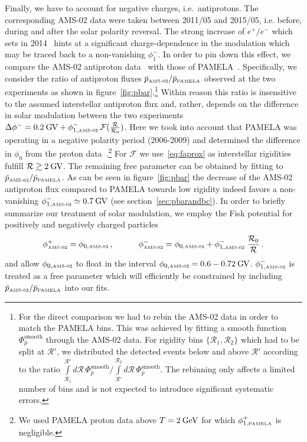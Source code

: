\documentclass[a4paper,11pt]{article}
\newcommand{\eVdist}{\kern-0.06em}
\newcommand{\gev}{\:\text{Ge\eVdist V}}
\newcommand{\gv}{\:\text{G\eVdist V}}
\begin{document}
Finally, we have to account for negative charges, i.e.\ antiprotons. The corresponding AMS-02 data were taken between 2011/05 and 2015/05, i.e. before, during and after the solar polarity reversal. The strong increase of $e^+/e^-$ which sets in 2014~\cite{Adriani:2016uhu} hints at a significant charge-dependence in the modulation which may be traced back to a non-vanishing $\phi_1^-$. In order to pin down this effect, we compare the AMS-02 antiproton data~\cite{Aguilar:2016kjl} with those of PAMELA~\cite{Adriani:2012paa}. Specifically, we consider the ratio of antiproton fluxes $\bar{p}_{\text{\tiny{AMS-02}}}/\bar{p}_{\text{\tiny{PAMELA}}}$ observed at the two experiments as shown in figure~\ref{fig:pbar}.\footnote{For the direct comparison we had to rebin the AMS-02 data in order to match the PAMELA bins. This was achieved by fitting a smooth function $\Phi_{\bar{p}}^\text{smooth}$ through the AMS-02 data. For rigidity bins $\{\mathcal{R}_1,\mathcal{R}_2\}$ which had to be split at $\mathcal{R}'$, we distributed the detected events below and above $\mathcal{R}'$ according to the ratio $\int\limits_{\mathcal{R}_1}^{\mathcal{R}'} d\mathcal{R}\,\Phi_{\bar{p}}^\text{smooth}/\int\limits_{\mathcal{R}'}^{\mathcal{R}_2}d\mathcal{R}\,\Phi_{\bar{p}}^\text{smooth}$. The rebinning only affects a limited number of bins and is not expected to introduce significant systematic errors.} Within reason this ratio is insensitive to the assumed interstellar antiproton flux and, rather, depends on the difference in solar modulation between the two experiments $\Delta\phi^-= 0.2\gv + \phi^-_{1,\text{\tiny{AMS-02}}} \,\mathcal{F}(\tfrac{\mathcal{R}}{\mathcal{R}_0})$. Here we took into account that PAMELA was operating in a negative polarity period (2006-2009) and determined the difference in $\phi_0$ from the proton data~\cite{Adriani:2013as,Aguilar:2015ooa}.\footnote{We used PAMELA proton data above $T=2\gev$ for which $\phi^+_{1,\text{\tiny{PAMELA}}}$ is negligible.} For $\mathcal{F}$ we use~\eqref{eq:faprox} as interstellar rigidities fulfill $\mathcal{R}\gtrsim 2\gv$. 
The remaining free parameter can be obtained by fitting to $\bar{p}_{\text{\tiny{AMS-02}}}/\bar{p}_{\text{\tiny{PAMELA}}}$. As can be seen in figure~\ref{fig:pbar} the decrease of the AMS-02 antiproton flux compared to PAMELA towards low rigidity indeed favors a non-vanishing $\phi^-_{1,\text{\tiny{AMS-02}}}\simeq 0.7\gv$ (see section~\ref{sec:pbarandbc}). 
In order to briefly summarize our treatment of solar modulation, we employ the Fisk potential for positively and negatively charged particles
\begin{equation}\label{eq:fiskpotentials}
  \phi^+_{\text{\tiny{AMS-02}}} = \phi_{0,\text{\tiny{AMS-02}}}\,,\qquad\quad
 \phi^-_{\text{\tiny{AMS-02}}} = \phi_{0,\text{\tiny{AMS-02}}} + \phi_{1,\text{\tiny{AMS-02}}}^-\;\frac{\mathcal{R}_0}{\mathcal{R}}\,.
\end{equation}
and allow $\phi_{0,\text{\tiny{AMS-02}}}$ to float in the interval $\phi_{0,\text{\tiny{AMS-02}}}=0.6-0.72\gv$. $\phi^-_{1,\text{\tiny{AMS-02}}}$ is treated as a free parameter which will efficiently be constrained by including $\bar{p}_{\text{\tiny{AMS-02}}}/\bar{p}_{\text{\tiny{PAMELA}}}$ into our fits.
\end{document}
